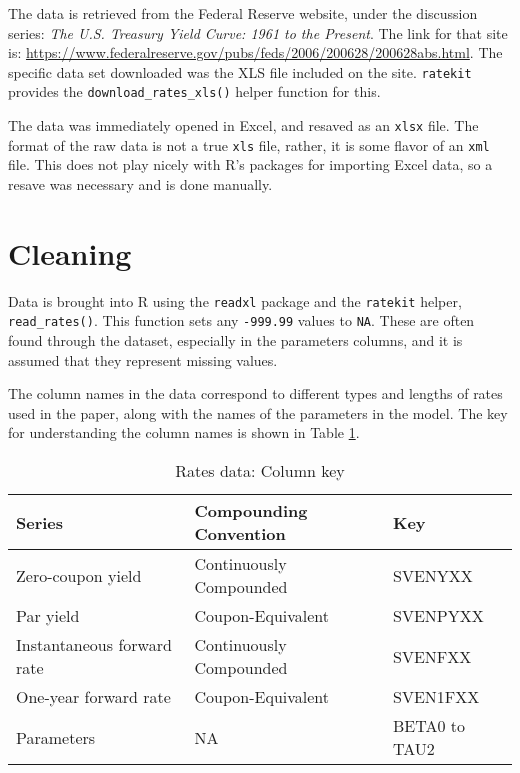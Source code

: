 \documentclass[openany]{book}
\theoremstyle{definition}
\theoremstyle{definition}
\theoremstyle{definition}
\theoremstyle{remark}
\begin{document}
The data is retrieved from the Federal Reserve website, under the
discussion series: \emph{The U.S. Treasury Yield Curve: 1961 to the
Present}. The link for that site is:
\url{https://www.federalreserve.gov/pubs/feds/2006/200628/200628abs.html}.
The specific data set downloaded was the XLS file included on the site.
\texttt{ratekit} provides the \texttt{download\_rates\_xls()} helper
function for this.

The data was immediately opened in Excel, and resaved as an
\texttt{xlsx} file. The format of the raw data is not a true
\texttt{xls} file, rather, it is some flavor of an \texttt{xml} file.
This does not play nicely with R's packages for importing Excel data, so
a resave was necessary and is done manually.

\hypertarget{cleaning}{%
\section{Cleaning}\label{cleaning}}

Data is brought into R using the \texttt{readxl} package and the
\texttt{ratekit} helper, \texttt{read\_rates()}. This function sets any
\texttt{-999.99} values to \texttt{NA}. These are often found through
the dataset, especially in the parameters columns, and it is assumed
that they represent missing values.

\small

\normalsize

The column names in the data correspond to different types and lengths
of rates used in the paper, along with the names of the parameters in
the model. The key for understanding the column names is shown in Table
\ref{tab:meta}.

\small

\begin{table}[H]

\caption{\label{tab:meta}Rates data: Column key}
\centering
\begin{tabular}[t]{lll}
\toprule
Series & Compounding Convention & Key\\
\midrule
Zero-coupon yield & Continuously Compounded & SVENYXX\\
Par yield & Coupon-Equivalent & SVENPYXX\\
Instantaneous forward rate & Continuously Compounded & SVENFXX\\
One-year forward rate & Coupon-Equivalent & SVEN1FXX\\
Parameters & NA & BETA0 to TAU2\\
\bottomrule
\end{tabular}
\end{table}
\end{document}

